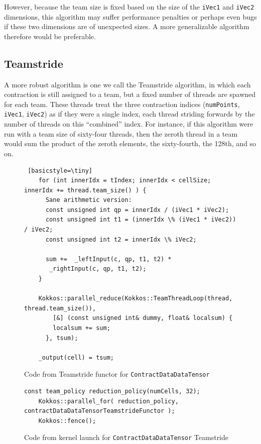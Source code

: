 However, because the team size is fixed based on the size of the \texttt{iVec1}
and \texttt{iVec2} dimensions, this algorithm may suffer performance penalties
or perhaps even bugs if these two dimensions are of unexpected sizes.  A more
generalizable algorithm therefore would be preferable.

\subsection{Teamstride}
    A more robust algorithm is one we call the Teamstride algorithm, in which
    each contraction is still assigned to a team, but a fixed number of threads
    are spawned for each team.  These threads treat the three contraction
    indices (\texttt{numPoints}, \texttt{iVec1}, \texttt{iVec2}) as if they were
    a single index, each thread striding forwards by the number of threads on
    this ``combined'' index.  For instance, if this algorithm were run with a
    team size of sixty-four threads, then the zeroth thread in a team would sum
    the product of the zeroth elements, the sixty-fourth, the 128th, and so on.
    
\begin{figure}[ht]
    \begin{lstlisting} [basicstyle=\tiny]
    for (int innerIdx = tIndex; innerIdx < cellSize; innerIdx += thread.team_size() ) {
      Sane arithmetic version:
      const unsigned int qp = innerIdx / (iVec1 * iVec2);
      const unsigned int t1 = (innerIdx \% (iVec1 * iVec2)) / iVec2;
      const unsigned int t2 = innerIdx \% iVec2;

      sum +=  _leftInput(c, qp, t1, t2) *
       _rightInput(c, qp, t1, t2);
    }

    Kokkos::parallel_reduce(Kokkos::TeamThreadLoop(thread, thread.team_size()),
        [&] (const unsigned int& dummy, float& localsum) {
        localsum += sum;
      }, tsum);

    _output(cell) = tsum;
    \end{lstlisting}

\caption{Code from Teamstride functor for \texttt{ContractDataDataTensor}
\label{lst:ContractDataDataTensorTeamstrideFunctor}} 
\end{figure}

\begin{figure}[ht]
    \begin{lstlisting}[basicstyle=\tiny]
    const team_policy reduction_policy(numCells, 32);
    Kokkos::parallel_for( reduction_policy, contractDataDataTensorTeamstrideFunctor );
    Kokkos::fence();
    \end{lstlisting}
\caption{Code from kernel launch for \texttt{ContractDataDataTensor} Teamstride
\label{lst:ContractDataDataTensorTeamstrideCall}} 
\end{figure}

